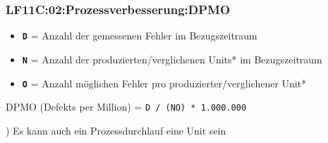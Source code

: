 \begin{frame}  
  \frametitle{LF11C:02:Prozessverbesserung:DPMO}

\begin{itemize}
  \item \textbf{\texttt{D}} = Anzahl der gemessenen Fehler im Bezugszeitraum
  \item \textbf{\texttt{N}} = Anzahl der produzierten/verglichenen Units* im Bezugszeitraum
  \item \textbf{\texttt{O}} = Anzahl möglichen Fehler pro produzierter/verglichener Unit* 
\end{itemize}

\vspace{0.5cm}
\begin{center}
  {\Large
    DPMO (Defekts per Million) = \texttt{D / (N\*O) * 1.000.000}
  }
\end{center}

\vspace{0.5cm}
{\footnotesize *) Es kann auch ein Prozessdurchlauf eine Unit sein}

\end{frame}
